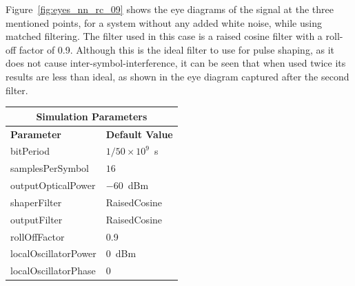 Figure~\ref{fig:eyes_nn_rc_09} shows the eye diagrams of the signal at the
three mentioned points, for a system without any added white noise, while using
matched filtering. The filter used in this case is a raised cosine filter with
a roll-off factor of 0.9. Although this is the ideal filter to use for pulse
shaping, as it does not cause inter-symbol-interference, it can be seen that
when used twice its results are less than ideal, as shown in the eye diagram
captured after the second filter.
\begin{table}[H]
	\centering
	\footnotesize
	\begin{tabular}{|l|l|}
		\hline
		\multicolumn{2}{|c|}{ \textbf{Simulation Parameters} } \\
		\hline
		\textbf{Parameter}     & \textbf{Default Value}                                     \\\hline
		bitPeriod              & $1/50\times10^9$~s														\\\hline
		samplesPerSymbol       & $16$                                                       \\\hline
		outputOpticalPower     & $-60$~dBm 													\\ \hline
		shaperFilter	       & RaisedCosine												\\ \hline
		outputFilter		   & RaisedCosine												\\ \hline
		rollOffFactor		   & 0.9														\\ \hline
				localOscillatorPower   & $0$~dBm                                                    \\ \hline
				localOscillatorPhase   & $0$                                                        \\ \hline

\end{tabular}
\end{table}
